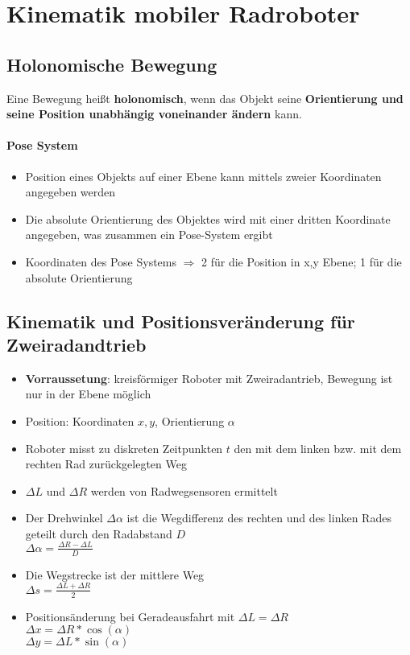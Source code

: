 \section{Kinematik mobiler Radroboter}
\subsection{Holonomische Bewegung}
Eine Bewegung heißt \textbf{holonomisch}, wenn das Objekt seine \textbf{Orientierung und seine Position unabhängig voneinander ändern} kann.
\paragraph{Pose System}
\begin{itemize}
	\item Position eines Objekts auf einer Ebene kann mittels zweier Koordinaten angegeben werden
	\item Die absolute Orientierung des Objektes wird mit einer dritten Koordinate angegeben, was zusammen ein Pose-System ergibt
	\item Koordinaten des Pose Systems $\Rightarrow$ 2 für die Position in x,y Ebene; 1 für die absolute Orientierung
\end{itemize}
\subsection{Kinematik und Positionsveränderung für Zweiradandtrieb}
\begin{itemize}
	\item \textbf{Vorraussetung}: kreisförmiger Roboter mit Zweiradantrieb, Bewegung ist nur in der Ebene möglich
	\item Position: Koordinaten $x,y$, Orientierung $\alpha$
	\item Roboter misst zu diskreten Zeitpunkten $t$ den mit dem linken bzw. mit dem rechten Rad zurückgelegten Weg
	\item $\Delta L$ und $\Delta R$ werden von Radwegsensoren ermittelt
\end{itemize}
\begin{itemize}
	\item Der Drehwinkel $\Delta \alpha$ ist die Wegdifferenz des rechten und des linken Rades geteilt durch den Radabstand $D$ \\
	$\Delta \alpha=\frac{\Delta R-\Delta L}{D}$
	\item Die Wegstrecke ist der mittlere Weg \\
	$\Delta s=\frac{\Delta L+\Delta R}{2}$
	\item Positionsänderung bei Geradeausfahrt mit $\Delta L = \Delta R$ \\
	$\Delta x=\Delta R * \cos (\alpha)$ \\
	$\Delta y=\Delta L * \sin (\alpha)$
\end{itemize}
